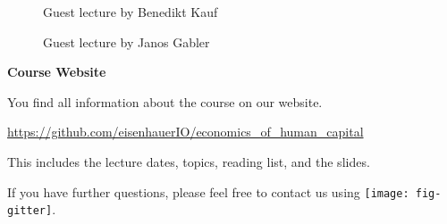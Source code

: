 \begin{frame}
	\begin{figure}
		\caption{Guest lecture by Benedikt Kauf}
		\centering{}
	\end{figure}
\end{frame}

\begin{frame}
	\begin{figure}
		\caption{Guest lecture by Janos Gabler}
		\centering{}
	\end{figure}
\end{frame}

\begin{frame}
	\textbf{Course Website}\vspace{0.3cm}

You find all information about the course on our website.

\begin{center}
\url{https://github.com/eisenhauerIO/economics_of_human_capital}
\end{center}

This includes the lecture dates, topics, reading list, and the slides.\vspace{0.3cm}

If you have further questions, please feel free to contact us using
\texttt{[image: fig-gitter]}.

\end{frame}
